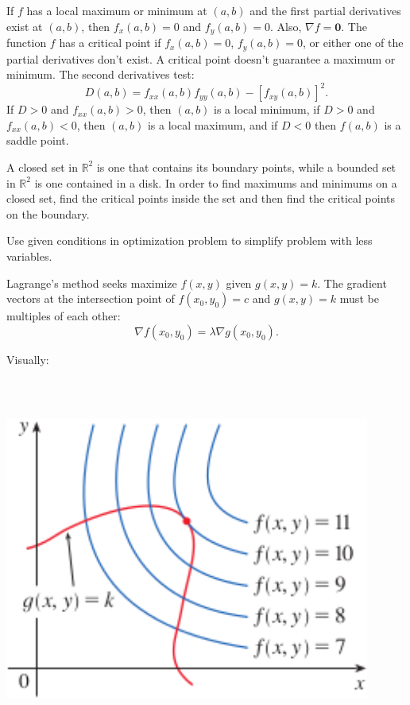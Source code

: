 \documentclass{article}
\begin{document}
If $f$ has a local maximum or minimum at $(a,b)$ and the first partial
derivatives exist at $(a,b)$, then $f_x(a,b)=0$ and $f_y(a,b)=0$. Also,
$\nabla f = \mathbf{0}$. The function $f$ has a critical point if $f_x(a,b)=0$, $f_y(a,b)=0$,
or either one of the partial derivatives don't exist. A critical point doesn't
guarantee a maximum or minimum. The second derivatives test:
\[D(a,b)=f_{xx}(a,b)f_{yy}(a,b)-[f_{xy}(a,b)]^2.\]
If $D>0$ and $f_{xx}(a,b)>0$, then $(a,b)$ is a local minimum,
if $D>0$ and $f_{xx}(a,b)<0$, then $(a,b)$ is a local maximum,
and if $D<0$ then $f(a,b)$ is a saddle point.

A closed set in $\mathbb{R}^2$ is one that contains its boundary points, while
a bounded set in $\mathbb{R}^2$ is one contained in a disk. In order to find
maximums and minimums on a closed set, find the critical points inside the set
and then find the critical points on the boundary.

Use given conditions in optimization problem to simplify problem with
less variables.

Lagrange's method seeks maximize $f(x,y)$ given $g(x,y)=k$. The gradient vectors
at the intersection point of $f(x_0,y_0)=c$ and $g(x,y)=k$ must be multiples of 
each other:
\[\nabla f(x_0,y_0) = \lambda \nabla g(x_0,y_0).\]

\noindent Visually: 
\begin{center}
    \includegraphics[width=12cm,height=12cm, keepaspectratio]{Images/LagrangeMultiplier.png}
\end{center}
\end{document}
